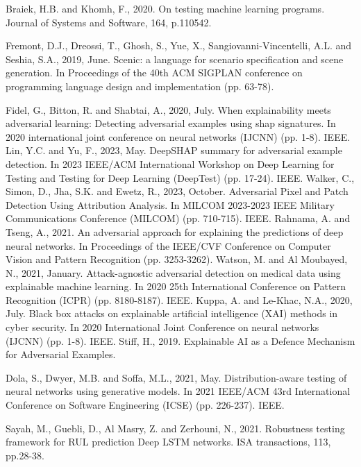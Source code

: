 \begin{singlespace}
\begin{thebibliography}{}
Braiek, H.B. and Khomh, F., 2020. On testing machine learning programs. Journal of Systems and Software, 164, p.110542.


 Fremont, D.J., Dreossi, T., Ghosh, S., Yue, X., Sangiovanni-Vincentelli, A.L. and Seshia, S.A., 2019, June. Scenic: a language for scenario specification and scene generation. In Proceedings of the 40th ACM SIGPLAN conference on programming language design and implementation (pp. 63-78).



Fidel, G., Bitton, R. and Shabtai, A., 2020, July. When explainability meets adversarial learning: Detecting adversarial examples using shap signatures. In 2020 international joint conference on neural networks (IJCNN) (pp. 1-8). IEEE.
Lin, Y.C. and Yu, F., 2023, May. DeepSHAP summary for adversarial example detection. In 2023 IEEE/ACM International Workshop on Deep Learning for Testing and Testing for Deep Learning (DeepTest) (pp. 17-24). IEEE.
Walker, C., Simon, D., Jha, S.K. and Ewetz, R., 2023, October. Adversarial Pixel and Patch Detection Using Attribution Analysis. In MILCOM 2023-2023 IEEE Military Communications Conference (MILCOM) (pp. 710-715). IEEE.
Rahnama, A. and Tseng, A., 2021. An adversarial approach for explaining the predictions of deep neural networks. In Proceedings of the IEEE/CVF Conference on Computer Vision and Pattern Recognition (pp. 3253-3262).
Watson, M. and Al Moubayed, N., 2021, January. Attack-agnostic adversarial detection on medical data using explainable machine learning. In 2020 25th International Conference on Pattern Recognition (ICPR) (pp. 8180-8187). IEEE.
Kuppa, A. and Le-Khac, N.A., 2020, July. Black box attacks on explainable artificial intelligence (XAI) methods in cyber security. In 2020 International Joint Conference on neural networks (IJCNN) (pp. 1-8). IEEE.
Stiff, H., 2019. Explainable AI as a Defence Mechanism for Adversarial Examples.




Dola, S., Dwyer, M.B. and Soffa, M.L., 2021, May. Distribution-aware testing of neural networks using generative models. In 2021 IEEE/ACM 43rd International Conference on Software Engineering (ICSE) (pp. 226-237). IEEE.

Sayah, M., Guebli, D., Al Masry, Z. and Zerhouni, N., 2021. Robustness testing framework for RUL prediction Deep LSTM networks. ISA transactions, 113, pp.28-38.


\end{thebibliography}
\end{singlespace}
